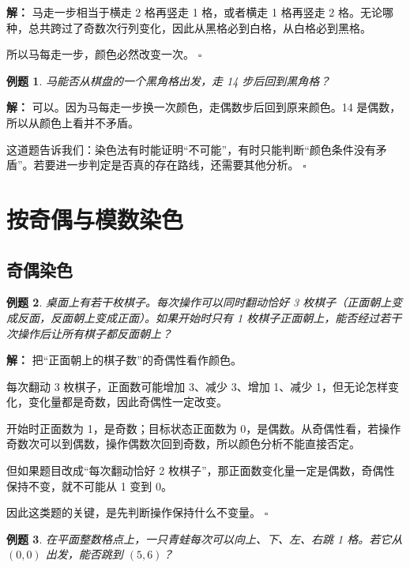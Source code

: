 \documentclass[11pt,a4paper,fontset=fandol]{ctexart}
\theoremstyle{formaltheorem}
\theoremstyle{formalexample}
\newtheorem{example}{例题}[section]
\newenvironment{solution}{\par\noindent\textbf{解：}}{\hfill$\square$\par}
\begin{document}
\begin{solution}
马走一步相当于横走 2 格再竖走 1 格，或者横走 1 格再竖走 2 格。无论哪种，总共跨过了奇数次行列变化，因此从黑格必到白格，从白格必到黑格。

所以马每走一步，颜色必然改变一次。
\end{solution}

\begin{example}
马能否从棋盘的一个黑角格出发，走 14 步后回到黑角格？
\end{example}

\begin{solution}
可以。因为马每走一步换一次颜色，走偶数步后回到原来颜色。14 是偶数，所以从颜色上看并不矛盾。

这道题告诉我们：染色法有时能证明“不可能”，有时只能判断“颜色条件没有矛盾”。若要进一步判定是否真的存在路线，还需要其他分析。
\end{solution}

\section{按奇偶与模数染色}

\subsection{奇偶染色}
\begin{example}
桌面上有若干枚棋子。每次操作可以同时翻动恰好 3 枚棋子（正面朝上变成反面，反面朝上变成正面）。如果开始时只有 1 枚棋子正面朝上，能否经过若干次操作后让所有棋子都反面朝上？
\end{example}

\begin{solution}
把“正面朝上的棋子数”的奇偶性看作颜色。

每次翻动 3 枚棋子，正面数可能增加 3、减少 3、增加 1、减少 1，但无论怎样变化，变化量都是奇数，因此奇偶性一定改变。

开始时正面数为 1，是奇数；目标状态正面数为 0，是偶数。从奇偶性看，若操作奇数次可以到偶数，操作偶数次回到奇数，所以颜色分析不能直接否定。

但如果题目改成“每次翻动恰好 2 枚棋子”，那正面数变化量一定是偶数，奇偶性保持不变，就不可能从 1 变到 0。

因此这类题的关键，是先判断操作保持什么不变量。
\end{solution}

\begin{example}
在平面整数格点上，一只青蛙每次可以向上、下、左、右跳 1 格。若它从 $(0,0)$ 出发，能否跳到 $(5,6)$？
\end{example}
\end{document}
